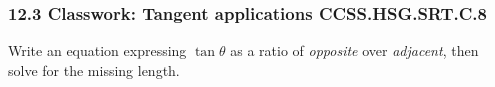 

\fancyhead[LE]{\thepage}



\subsubsection*{12.3 Classwork: Tangent applications \hfill CCSS.HSG.SRT.C.8}
Write an equation expressing $\tan \theta$ as a ratio of \emph{opposite} over \emph{adjacent}, then solve for the missing length.
